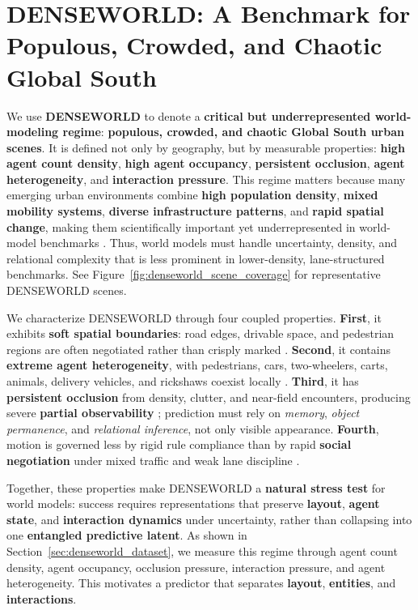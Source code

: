 





\section{\textbf{DENSEWORLD}: A Benchmark for \textbf{Populous, Crowded, and Chaotic} Global South}

We use \textbf{DENSEWORLD} to denote a \textbf{critical but underrepresented world-modeling regime}: \textbf{populous, crowded, and chaotic Global South urban scenes}. It is defined not only by geography, but by measurable properties: \textbf{high agent count density}, \textbf{high agent occupancy}, \textbf{persistent occlusion}, \textbf{agent heterogeneity}, and \textbf{interaction pressure}. This regime matters because many emerging urban environments combine \textbf{high population density}, \textbf{mixed mobility systems}, \textbf{diverse infrastructure patterns}, and \textbf{rapid spatial change}, making them scientifically important yet underrepresented in world-model benchmarks \cite{mahendra2021seven,ellis2016leveraging}. Thus, world models must handle uncertainty, density, and relational complexity that is less prominent in lower-density, lane-structured benchmarks. See Figure~\ref{fig:denseworld_scene_coverage} for representative DENSEWORLD scenes.



We characterize DENSEWORLD through four coupled properties. \textbf{First}, it exhibits \textbf{soft spatial boundaries}: road edges, drivable space, and pedestrian regions are often negotiated rather than crisply marked \cite{varma2019idd, dokania2023idd3d}. \textbf{Second}, it contains \textbf{extreme agent heterogeneity}, with pedestrians, cars, two-wheelers, carts, animals, delivery vehicles, and rickshaws coexist locally \cite{khan1999heterogeneous,asaithambi2012mixedtraffic}. \textbf{Third}, it has \textbf{persistent occlusion} from density, clutter, and near-field encounters, producing severe \textbf{partial observability} \cite{varma2019idd, dokania2023idd3d}; prediction must rely on \emph{memory}, \emph{object permanence}, and \emph{relational inference}, not only visible appearance. \textbf{Fourth}, motion is governed less by rigid rule compliance than by rapid \textbf{social negotiation} under mixed traffic and weak lane discipline \cite{papathanasopoulou2018weaklane,asaithambi2012mixedtraffic}.

Together, these properties make DENSEWORLD a \textbf{natural stress test} for world models: success requires representations that preserve \textbf{layout}, \textbf{agent state}, and \textbf{interaction dynamics} under uncertainty, rather than collapsing into one \textbf{entangled predictive latent}. As shown in Section~\ref{sec:denseworld_dataset}, we measure this regime through agent count density, agent occupancy, occlusion pressure, interaction pressure, and agent heterogeneity. This motivates a predictor that separates \textbf{layout}, \textbf{entities}, and \textbf{interactions}.


